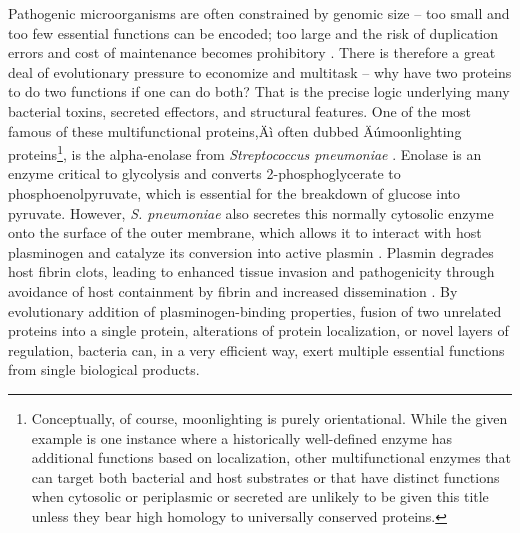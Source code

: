 Pathogenic microorganisms are often constrained by genomic size -- too small and too few essential functions can be encoded; too large and the risk of duplication errors and cost of maintenance becomes prohibitory \citep{Ranea2005, Bobay2017}. There is therefore a great deal of evolutionary pressure to economize and multitask -- why have two proteins to do two functions if one can do both? That is the precise logic underlying many bacterial toxins, secreted effectors, and structural features. One of the most famous of these multifunctional proteins,Äì often dubbed Äúmoonlighting proteins\footnote{Conceptually, of course, moonlighting is purely orientational. While the given example is one instance where a historically well-defined enzyme has additional functions based on localization, other multifunctional enzymes that can target both bacterial and host substrates or that have distinct functions when cytosolic or periplasmic or secreted are unlikely to be given this title unless they bear high homology to universally conserved proteins.}, is the alpha-enolase from \textit{Streptococcus pneumoniae} \citep{Bergmann2001}. Enolase is an enzyme critical to glycolysis and converts 2-phosphoglycerate to phosphoenolpyruvate, which is essential for the breakdown of glucose into pyruvate. However, \textit{S. pneumoniae} also secretes this normally cytosolic enzyme onto the surface of the outer membrane, which allows it to interact with host plasminogen and catalyze its conversion into active plasmin \citep{Bergmann2013}. Plasmin degrades host fibrin clots, leading to enhanced tissue invasion and pathogenicity through avoidance of host containment by fibrin and increased dissemination \citep{Whiting2002, Weiser2018}. By evolutionary addition of plasminogen-binding properties, fusion of two unrelated proteins into a single protein, alterations of protein localization, or novel layers of regulation, bacteria can, in a very efficient way, exert multiple essential functions from single biological products.

